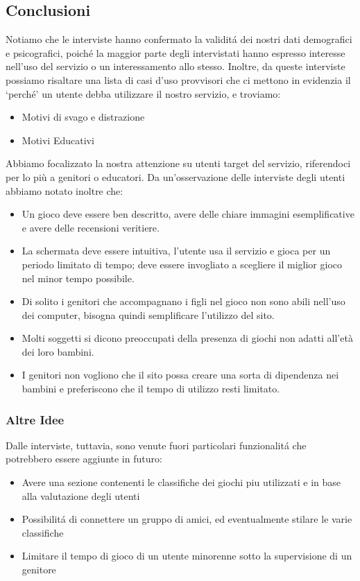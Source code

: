 \documentclass[../Report.tex]{subfiles}
\begin{document}
    \newpage
    \subsection{Conclusioni}

    Notiamo che le interviste hanno confermato la validitá dei nostri dati demografici e psicografici, poiché la maggior parte  degli intervistati hanno espresso interesse nell’uso del servizio o un interessamento allo stesso.
    Inoltre, da queste interviste possiamo risaltare una lista di casi d’uso provvisori che ci mettono in evidenzia il ‘perché’ un utente debba utilizzare il nostro servizio, e troviamo:
    \begin{itemize}
        \item Motivi di svago e distrazione
        \item Motivi Educativi
    \end{itemize}
    Abbiamo focalizzato la nostra attenzione su utenti target del servizio, riferendoci per lo più a genitori o educatori. 
    Da un’osservazione delle interviste degli utenti abbiamo notato inoltre che:
    \begin{itemize}
        \item Un gioco deve essere ben descritto, avere delle chiare immagini esemplificative e avere delle recensioni veritiere.
        \item La schermata deve essere intuitiva, l’utente usa il servizio e gioca per un periodo limitato di tempo; deve essere invogliato a scegliere il miglior gioco nel minor tempo possibile.
        \item Di solito i genitori che accompagnano i figli nel gioco non sono abili nell’uso dei computer, bisogna quindi semplificare l'utilizzo del sito. 
        \item Molti soggetti si dicono preoccupati della presenza di giochi non adatti all'età dei loro bambini. 
        \item I genitori non vogliono che il sito possa creare una sorta di dipendenza nei bambini e preferiscono che il tempo di utilizzo resti limitato. 
    \end{itemize}
    

    \subsubsection*{Altre Idee}
    Dalle interviste, tuttavia, sono venute fuori particolari funzionalitá che potrebbero essere aggiunte in futuro:
    \begin{itemize}
        \item Avere una sezione contenenti le classifiche dei giochi piu utilizzati e in base alla valutazione degli utenti
        \item Possibilitá di connettere un gruppo di amici, ed eventualmente stilare le varie classifiche 
        \item Limitare il tempo di gioco di un utente minorenne sotto la supervisione di un genitore
        
    \end{itemize}
\end{document}
